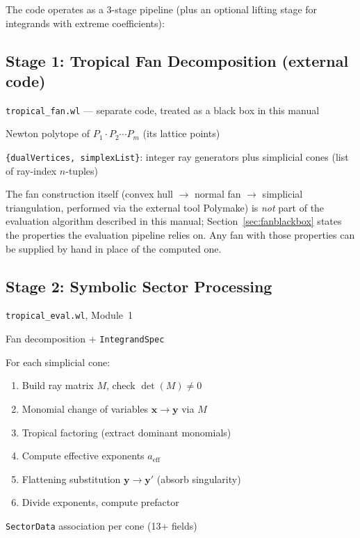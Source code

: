 \documentclass[11pt,a4paper]{article}
\begin{document}
The code operates as a 3-stage pipeline (plus an optional lifting stage for
integrands with extreme coefficients):

\subsection{Stage 1: Tropical Fan Decomposition (external code)}
\begin{description}[style=nextline]
  \item[Source:] \texttt{tropical\_fan.wl} --- separate code, treated as a black box in this manual
  \item[Input:] Newton polytope of $P_1 \cdot P_2 \cdots P_m$ (its lattice points)
  \item[Output:] \texttt{\{dualVertices, simplexList\}}: integer ray generators plus simplicial cones (list of ray-index $n$-tuples)
\end{description}

The fan construction itself (convex hull $\to$ normal fan $\to$ simplicial triangulation, performed via the external tool Polymake) is \emph{not} part of the evaluation algorithm described in this manual; Section~\ref{sec:fanblackbox} states the properties the evaluation pipeline relies on. Any fan with those properties can be supplied by hand in place of the computed one.

\subsection{Stage 2: Symbolic Sector Processing}
\begin{description}[style=nextline]
  \item[Source:] \texttt{tropical\_eval.wl}, Module~1
  \item[Input:] Fan decomposition + \texttt{IntegrandSpec}
  \item[Process:] For each simplicial cone:
    \begin{enumerate}[label=(\alph*)]
      \item Build ray matrix $M$, check $\det(M) \neq 0$
      \item Monomial change of variables $\mathbf{x} \to \mathbf{y}$ via $M$
      \item Tropical factoring (extract dominant monomials)
      \item Compute effective exponents $a_{\mathrm{eff}}$
      \item Flattening substitution $\mathbf{y} \to \mathbf{y}'$ (absorb singularity)
      \item Divide exponents, compute prefactor
    \end{enumerate}
  \item[Output:] \texttt{SectorData} association per cone (13+ fields)
\end{description}
\end{document}
